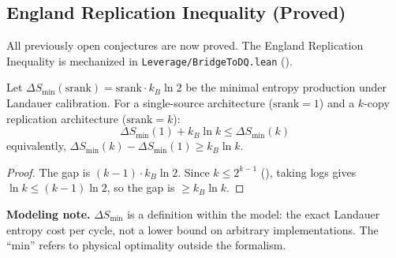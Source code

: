 \subsection{England Replication Inequality (Proved)}

All previously open conjectures are now proved. The England Replication Inequality is mechanized in \nolinkurl{Leverage/BridgeToDQ.lean} ().

\begin{theorem}\label{thm:england}
Let $\Delta S_{\min}(\text{srank}) = \text{srank} \cdot k_B \ln 2$ be the minimal entropy production under Landauer calibration. For a single-source architecture ($\text{srank} = 1$) and a $k$-copy replication architecture ($\text{srank} = k$):
\[
\Delta S_{\min}(1) + k_B \ln k \leq \Delta S_{\min}(k)
\]
equivalently, $\Delta S_{\min}(k) - \Delta S_{\min}(1) \geq k_B \ln k$.
\end{theorem}


\begin{proof}
The gap is $(k-1) \cdot k_B \ln 2$. Since $k \leq 2^{k-1}$ (), taking logs gives $\ln k \leq (k-1) \ln 2$, so the gap is $\geq k_B \ln k$.
\end{proof}

\textbf{Modeling note.} $\Delta S_{\min}$ is a definition within the model: the exact Landauer entropy cost per cycle, not a lower bound on arbitrary implementations. The ``min'' refers to physical optimality outside the formalism.
